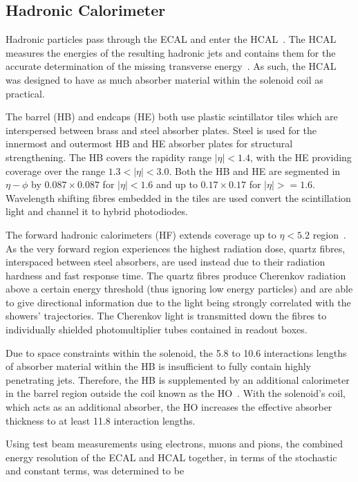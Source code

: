 \subsection{Hadronic Calorimeter}\label{subsec:HCAL}
Hadronic particles pass through the ECAL and enter the HCAL~\cite{HCAL:tdr}.
The HCAL measures the energies of the resulting hadronic jets and contains them for the accurate determination of the missing transverse energy~\cite{HCAL:tdr}.
As such, the HCAL was designed to have as much absorber material within the solenoid coil as practical. 

The barrel (HB) and endcaps (HE) both use plastic scintillator tiles which are interspersed between brass and steel absorber plates.
Steel is used for the innermost and outermost HB and HE absorber plates for structural strengthening.
The HB covers the rapidity range $|\eta| < 1.4$, with the HE providing coverage over the range $1.3 < |\eta| < 3.0$.
Both the HB and HE are segmented in $\eta - \phi$ by $0.087 \times 0.087$ for $| \eta | < 1.6$ and up to $0.17 \times 0.17$ for $| \eta | >= 1.6$.
Wavelength shifting fibres embedded in the tiles are used convert the scintillation light and channel it to hybrid photodiodes.

The forward hadronic calorimeters (HF) extends coverage up to $\eta < 5.2$ region~\cite{HF}.
As the very forward region experiences the highest radiation dose, quartz fibres, interspaced between steel absorbers, are used instead due to their radiation hardness and fast response time.
The quartz fibres produce Cherenkov radiation above a certain energy threshold (thus ignoring low energy particles) and are able to give directional information due to the light being strongly correlated with the showers' trajectories.
The Cherenkov light is transmitted down the fibres to individually shielded photomultiplier tubes contained in readout boxes.

Due to space constraints within the solenoid, the 5.8 to 10.6 interactions lengths of absorber material within the HB is insufficient to fully contain highly penetrating jets.
Therefore, the HB is supplemented by an additional calorimeter in the barrel region outside the coil known as the HO~\cite{HO}.
With the solenoid's coil, which acts as an additional absorber, the HO increases the effective absorber thickness to at least 11.8 interaction lengths.

Using test beam measurements using electrons, muons and pions, the combined energy resolution of the ECAL and HCAL together, in terms of the stochastic and constant terms, was determined to be

